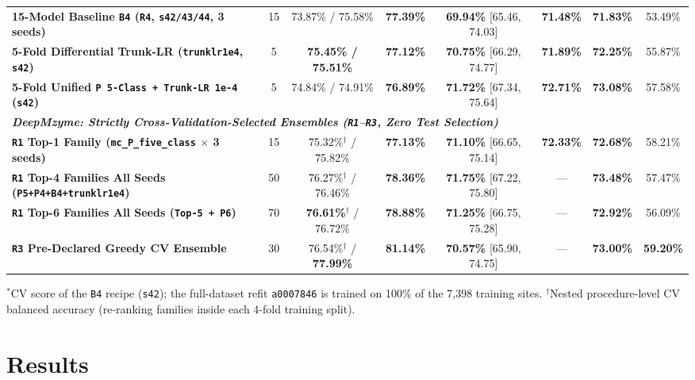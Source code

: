 \documentclass[10pt,a4paper,twocolumn]{article}
\begin{document}
\begin{table}[t!]
\begin{tabular}{lccccccc}
    \textbf{15-Model Baseline \texttt{B4} (\texttt{R4}, \texttt{s42/43/44}, 3 seeds)} & 15 & 73.87\% / 75.58\% & \textbf{77.39\%} & \textbf{69.94\%} [65.46, 74.03] & \textbf{71.48\%} & \textbf{71.83\%} & 53.49\% \\
    \textbf{5-Fold Differential Trunk-LR (\texttt{trunklr1e4}, \texttt{s42})} & 5 & \textbf{75.45\% / 75.51\%} & \textbf{77.12\%} & \textbf{70.75\%} [66.29, 74.77] & \textbf{71.89\%} & \textbf{72.25\%} & 55.87\% \\
    \textbf{5-Fold Unified \texttt{P 5-Class + Trunk-LR 1e-4} (\texttt{s42})} & 5 & 74.84\% / 74.91\% & \textbf{76.89\%} & \textbf{71.72\%} [67.34, 75.64] & \textbf{72.71\%} & \textbf{73.08\%} & 57.58\% \\
    \midrule
    \multicolumn{8}{l}{\textit{\textbf{DeepMzyme: Strictly Cross-Validation-Selected Ensembles (\texttt{R1}--\texttt{R3}, Zero Test Selection)}}} \\
    \textbf{\texttt{R1} Top-1 Family (\texttt{mc\_P\_five\_class} $\times$ 3 seeds)} & 15 & 75.32\%$^\dagger$ / 75.82\% & \textbf{77.13\%} & \textbf{71.10\%} [66.65, 75.14] & \textbf{72.33\%} & \textbf{72.68\%} & 58.21\% \\
    \textbf{\texttt{R1} Top-4 Families All Seeds (\texttt{P5+P4+B4+trunklr1e4})} & 50 & 76.27\%$^\dagger$ / 76.46\% & \textbf{78.36\%} & \textbf{71.75\%} [67.22, 75.80] & --- & \textbf{73.48\%} & 57.47\% \\
    \textbf{\texttt{R1} Top-6 Families All Seeds (\texttt{Top-5 + P6})} & 70 & \textbf{76.61\%}$^\dagger$ / 76.72\% & \textbf{78.88\%} & \textbf{71.25\%} [66.75, 75.28] & --- & \textbf{72.92\%} & 56.09\% \\
    \textbf{\texttt{R3} Pre-Declared Greedy CV Ensemble} & 30 & 76.54\%$^\dagger$ / \textbf{77.99\%} & \textbf{81.14\%} & \textbf{70.57\%} [65.90, 74.75] & --- & \textbf{73.00\%} & \textbf{59.20\%} \\
    \bottomrule
  \end{tabular}
  \vspace{2pt}
  \begin{flushleft}
    \scriptsize $^*$CV score of the \texttt{B4} recipe (\texttt{s42}); the full-dataset refit \texttt{a0007846} is trained on 100\% of the 7,398 training sites. $^\dagger$Nested procedure-level CV balanced accuracy (re-ranking families inside each 4-fold training split).
  \end{flushleft}
\end{table}

\section{Results}
\end{document}
